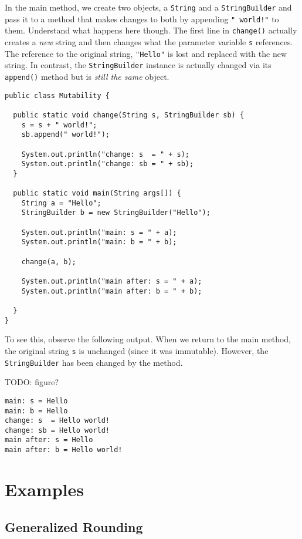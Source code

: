 In the main method, we create two objects, a 
\texttt{String} and a \texttt{StringBuilder}
and pass it to a method that makes changes to both by
appending \texttt{" world!"} to them.  Understand
what happens here though.  The first line in \texttt{change()}
actually creates a \emph{new} string and then changes
what the parameter variable \texttt{s} references.
The reference to the original string, \texttt{"Hello"} is lost and
replaced with the new string.  In contrast, the \texttt{StringBuilder}
instance is actually changed via its \texttt{append()}
method but is \emph{still the same} object.

\begin{verbatim}
public class Mutability {
  
  public static void change(String s, StringBuilder sb) {    
    s = s + " world!";
    sb.append(" world!");
    
    System.out.println("change: s  = " + s);
    System.out.println("change: sb = " + sb);
  }

  public static void main(String args[]) {
    String a = "Hello";
    StringBuilder b = new StringBuilder("Hello");

    System.out.println("main: s = " + a);
    System.out.println("main: b = " + b);
    
    change(a, b);

    System.out.println("main after: s = " + a);
    System.out.println("main after: b = " + b);

  }
}
\end{verbatim}

To see this, observe the following output.  When we
return to the main method, the original string \texttt{s}
is unchanged (since it was immutable).  However, the
\texttt{StringBuilder} has been changed by
the method.

TODO: figure?

\begin{verbatim}
main: s = Hello
main: b = Hello
change: s  = Hello world!
change: sb = Hello world!
main after: s = Hello
main after: b = Hello world!
\end{verbatim}

\section{Examples}

\subsection{Generalized Rounding}

